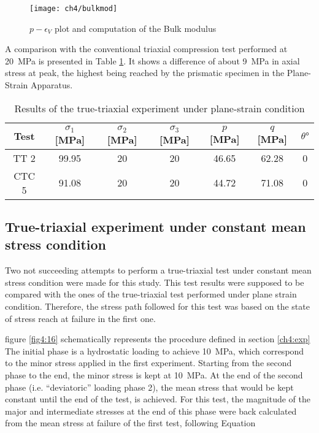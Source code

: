 \begin{figure}[tb]
    \centering
    \texttt{[image: ch4/bulkmod]}
    \caption{$p-\epsilon_V$ plot and computation of the Bulk modulus}
    \label{fig4:15}
\end{figure} 

A comparison with the conventional triaxial compression test performed at \SI{20}{MPa} is presented in Table \ref{tb4:TT2_CTC5}. It shows a difference of about \SI{9}{MPa} in axial stress at peak, the highest being reached by the prismatic specimen in the Plane-Strain Apparatus.

\begin{table}
    \centering
    \begin{tabular}{ccccccc}
        \hline
        Test & $\sigma_1$ [\si{MPa}] & $\sigma_2$ [\si{MPa}] & $\sigma_3$ [\si{MPa}] & $p$ [\si{MPa}] & $q$ [\si{MPa}] & $\theta \si{\degree}$ \\
        \hline
        \hline
        TT 2 & 99.95 & 20 & 20 & 46.65 & 62.28 & 0\\
        CTC 5 & 91.08 & 20 & 20 & 44.72 & 71.08 & 0 \\
        \hline
    \end{tabular}
    \caption{Results of the true-triaxial experiment under plane-strain condition}
    \label{tb4:TT2_CTC5}
\end{table}

\subsection{True-triaxial experiment under constant mean stress condition}

Two not succeeding attempts to perform a true-triaxial test under constant mean stress condition were made for this study. This test results were supposed to be compared with the ones of the true-triaxial test performed under plane strain condition. Therefore, the stress path followed for this test was based on the state of stress reach at failure in the first one.

figure \ref{fig4:16} schematically represents the procedure defined in section \ref{ch4:exp} The initial phase is a hydrostatic loading to achieve \SI{10}{MPa}, which correspond to the minor stress applied in the first experiment. Starting from the second phase to the end, the minor stress is kept at \SI{10}{MPa}. At the end of the second phase (i.e. “deviatoric” loading phase 2), the mean stress that would be kept constant until the end of the test, is achieved. For this test, the magnitude of the major and intermediate stresses at the end of this phase were back calculated from the mean stress at failure of the first test, following Equation

